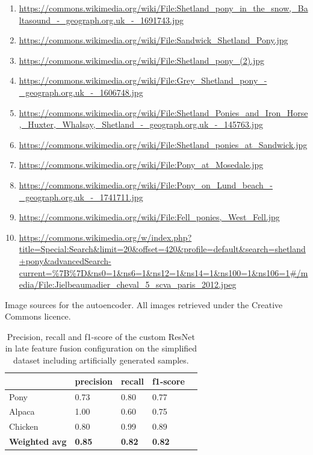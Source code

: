 \documentclass{l4proj}
\begin{document}
\begin{appendices}
\begin{captionedList}
  \begin{enumerate}
    \item{\url{https://commons.wikimedia.org/wiki/File:Shetland_pony_in_the_snow,_Baltasound_-_geograph.org.uk_-_1691743.jpg}}
    \item{\url{https://commons.wikimedia.org/wiki/File:Sandwick_Shetland_Pony.jpg}}
    \item{\url{https://commons.wikimedia.org/wiki/File:Shetland_pony_(2).jpg}}
    \item{\url{https://commons.wikimedia.org/wiki/File:Grey_Shetland_pony_-_geograph.org.uk_-_1606748.jpg}}
    \item{\url{https://commons.wikimedia.org/wiki/File:Shetland_Ponies_and_Iron_Horse,_Huxter,_Whalsay,_Shetland_-_geograph.org.uk_-_145763.jpg}}
    \item{\url{https://commons.wikimedia.org/wiki/File:Shetland_ponies_at_Sandwick.jpg}}
    \item{\url{https://commons.wikimedia.org/wiki/File:Pony_at_Mosedale.jpg}}
    \item{\url{https://commons.wikimedia.org/wiki/File:Pony_on_Lund_beach_-_geograph.org.uk_-_1741711.jpg}}
    \item{\url{https://commons.wikimedia.org/wiki/File:Fell_ponies,_West_Fell.jpg}}
    \item{\url{https://commons.wikimedia.org/w/index.php?title=Special:Search&limit=20&offset=420&profile=default&search=shetland+pony&advancedSearch-current=%7B%7D&ns0=1&ns6=1&ns12=1&ns14=1&ns100=1&ns106=1#/media/File:Jielbeaumadier_cheval_5_scva_paris_2012.jpeg}}
  \end{enumerate}
  \caption{Image sources for the autoencoder. All images retrieved under the Creative Commons licence.}
  \label{list:image_sources}
\end{captionedList}

\begin{table}[H]
  \centering
  \begin{tabular}{@{}lllll@{}}
  \toprule
                        & \textbf{precision} & \textbf{recall} & \textbf{f1-score} &  \\ \midrule
  Pony                  & 0.73               & 0.80            & 0.77              &  \\
  Alpaca                & 1.00               & 0.60            & 0.75              &  \\
  Chicken               & 0.80               & 0.99            & 0.89              &  \\
  \midrule
  \textbf{Weighted avg} & \textbf{0.85}      & \textbf{0.82}   & \textbf{0.82}     &  \\ \bottomrule
  \end{tabular}
  \caption{Precision, recall and f1-score of the custom ResNet in late feature fusion configuration on the simplified dataset including artificially generated samples.}
  \label{table:auto_scores_normal}
\end{table}


\end{appendices}
\end{document}
